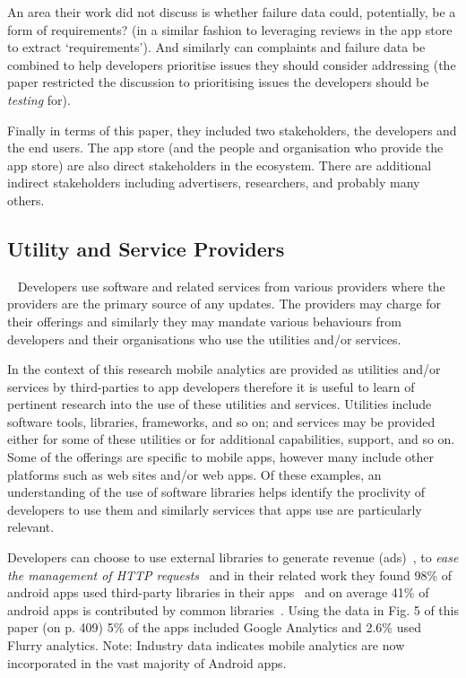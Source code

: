 An area their work did not discuss is whether failure data could, potentially, be a form of requirements? (in a similar fashion to leveraging reviews in the app store to extract `requirements'). And similarly can complaints and failure data be combined to help developers prioritise issues they should consider addressing (the paper restricted the discussion to prioritising issues the developers should be \textit{testing} for).

Finally in terms of this paper, they included two stakeholders, the developers and the end users. The app store (and the people and organisation who provide the app store) are also direct stakeholders in the ecosystem. There are additional indirect stakeholders including advertisers, researchers, and probably many others. 

\subsection{Utility and Service Providers}~\label{rw-utility-and-service-providers-topic}
Developers use software and related services from various providers where the providers are the primary source of any updates. The providers may charge for their offerings and similarly they may mandate various behaviours from developers and their organisations who use the utilities and/or services.

In the context of this research mobile analytics are provided as utilities and/or services by third-parties to app developers therefore it is useful to learn of pertinent research into the use of these utilities and services. Utilities include software tools, libraries, frameworks, and so on; and services may be provided either for some of these utilities or for additional capabilities, support, and so on. Some of the offerings are specific to mobile apps, however many include other platforms such as web sites and/or web apps. Of these examples, an understanding of the use of software libraries helps identify the proclivity of developers to use them and similarly services that apps use are particularly relevant.


Developers can choose to use external libraries to generate revenue (ads)~, to \emph{ease the management of HTTP requests}~ and in their related work they found 98\% of android apps used third-party libraries in their apps~ and on average 41\% of android apps is contributed by common libraries~. Using the data in Fig. 5 of this paper (on p. 409) 5\% of the apps included Google Analytics and 2.6\% used Flurry analytics. Note: Industry data indicates mobile analytics are now incorporated in the vast majority of Android apps.  

